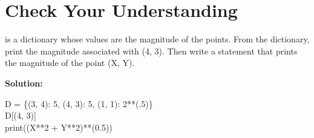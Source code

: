 \documentclass{article}
\newcommand{\icode}[1]{{\ttfamily #1}}
\begin{document}
\section{Check Your Understanding}
\noindent \icode{D} is a dictionary whose values are the magnitude of the points. From the dictionary, print the magnitude associated with (4, 3). Then write a statement that prints the magnitude of the point \icode{(X, Y)}.
\vspace{1 mm}

\noindent\textbf{Solution:}
\begin{tcolorbox}
	\ttfamily D = \{(3, 4): 5, (4, 3): 5, (1, 1): 2**(.5)\}\\
	D[(4, 3)]\\
	print((X**2 + Y**2)**(0.5))
\end{tcolorbox}
\end{document}
